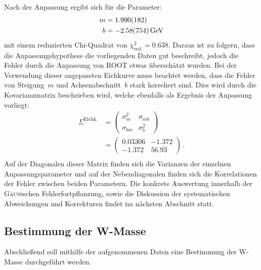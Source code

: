 \documentclass[11pt, a4paper]{article}
\numberwithin{equation}{section}
\begin{document}
\noindent Nach der Anpassung ergibt sich für die Parameter:
\begin{align*}
	m &= \num{1.990 +- 0.182} \\
	b &= \SI{-2.58 +- 7.54}{\GeV}
\end{align*}
mit einem reduzierten Chi-Quadrat von $\chi_\mathrm{red.}^2 = \num{0.638}$.
Daraus ist zu folgern, dass die Anpassungshypothese die vorliegenden Daten gut beschreibt, jedoch die Fehler durch die Anpassung von ROOT etwas überschätzt wurden.
Bei der Verwendung dieser angepassten Eichkurve muss beachtet werden, dass die Fehler von Steigung~$m$ und Achsenabschnitt~$b$ stark korreliert sind.
Dies wird durch die Kovarianzmatrix beschrieben wird, welche ebenfalls als Ergebnis der Anpassung vorliegt:
\begin{align*}
			\Sigma^\mathrm{Eichk.} &= \begin{pmatrix}
			\sigma_m^2 & \sigma_{mb} \\
			\sigma_{bm} & \sigma_b^2
			\end{pmatrix}\\
			&= \begin{pmatrix}
			\num{0.03306} & \num{-1.372} \\
			\num{-1.372}    & \num{56.93}
			\end{pmatrix} \, \text{.}\\
\end{align*}
Auf der Diagonalen dieser Matrix finden sich die Varianzen der einzelnen Anpassungsparameter und auf der Nebendiagonalen finden sich die Korrelationen der Fehler zwischen beiden Parametern.
Die konkrete Auswertung innerhalb der \textsc{Gauß}schen Fehlerfortpflanzung, sowie die Diskussion der systematischen Abweichungen und Korrekturen findet im nächsten Abschnitt statt.

\subsection{Bestimmung der W-Masse}
Abschließend soll mithilfe der aufgenommenen Daten eine Bestimmung der W-Masse durchgeführt werden.
\end{document}
